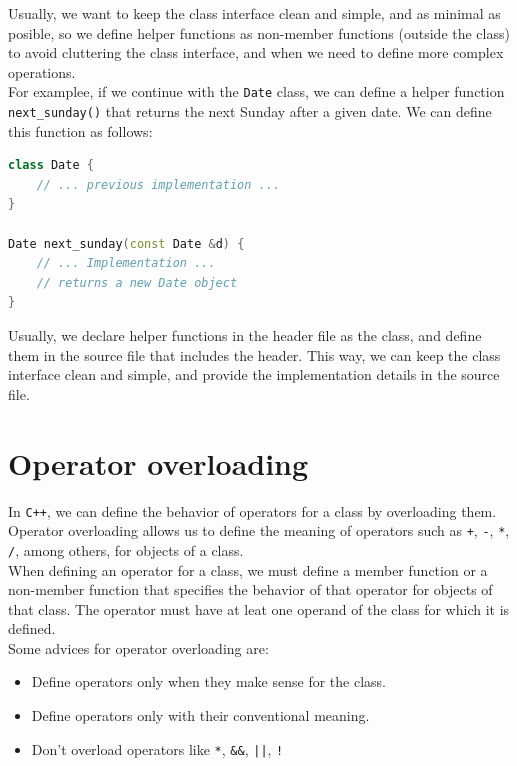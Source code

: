 Usually, we want to keep the class interface clean and simple, and as minimal as
posible, so we define helper functions as non-member functions (outside the class) to
avoid cluttering the class interface, and when we need to define more complex operations.\\

For examplee, if we continue with the \texttt{Date} class, we can define a helper
function \texttt{next\_sunday()} that returns the next Sunday after a given date. We can
define this function as follows:\\

\begin{lstlisting}[language=C++]
class Date {
    // ... previous implementation ...
}

Date next_sunday(const Date &d) {
    // ... Implementation ...
    // returns a new Date object
}
\end{lstlisting}

Usually, we declare helper functions in the header file as the class, and define them
in the source file that includes the header. This way, we can keep the class interface
clean and simple, and provide the implementation details in the source file.

\section{Operator overloading}

In \texttt{C++}, we can define the behavior of operators for a class by overloading
them. Operator overloading allows us to define the meaning of operators such as
\texttt{+}, \texttt{-}, \texttt{*}, \texttt{/}, among others, for objects of a class.\\

When defining an operator for a class, we must define a member function or a non-member
function that specifies the behavior of that operator for objects of that class. The 
operator must have at leat one operand of the class for which it is defined.\\

Some advices for operator overloading are:

\begin{itemize}
    \item Define operators only when they make sense for the class.
    \item Define operators only with their conventional meaning.
    \item Don't overload operators like \texttt{*}, \texttt{\&\&}, \texttt{||}, \texttt{!}
\end{itemize}

